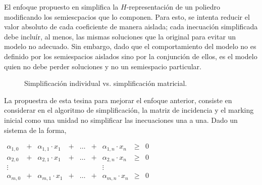 El enfoque propuesto en \cite{LeonCB15} simplifica la $H$-representación de un poliedro modificando los semiescpacios
que lo componen. Para esto, se intenta reducir el valor absoluto de cada coeficiente de manera aislada; cada inecuación
simplificada debe incluír, al menos, las mismas soluciones que la original para evitar un modelo no adecuado. Sin embargo,
dado que el comportamiento del modelo no es definido por los semiespacios aislados sino por la conjunción de ellos,
es el modelo quien no debe perder soluciones y no un semiespacio particular.

\begin{figure}[t]
  \centering
  \hfill
  \caption{Simplificación individual vs. simplificación matricial.}
  \label{fig:glob_encoding}
\end{figure}

La propuestra de esta tesina para mejorar el enfoque anterior, consiste en considerar
en el algoritmo de simplificación, la matriz de incidencia y el marking inicial como
una unidad no simplificar las inecuaciones una a una.
Dado un sistema de la forma,

\begin{center}
    $\begin{array}{rcccccccl}
        \alpha_{1,0} & + & \alpha_{1,1} \cdot x_1 & + & \dots & + & \alpha_{1,n} \cdot x_n & \ge & 0 \\
        \alpha_{2,0} & + & \alpha_{2,1} \cdot x_1 & + & \dots & + & \alpha_{2,n} \cdot x_n & \ge & 0 \\
            \vdots & & & & & & \vdots \\
        \alpha_{m,0} & + & \alpha_{m,1} \cdot x_1 & + & \dots & + & \alpha_{m,n} \cdot x_n & \ge & 0
    \end{array}$
\end{center}

